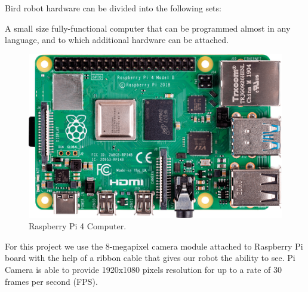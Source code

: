 \documentclass[runningheads]{llncs}
\begin{document}
Bird robot hardware can be divided into the following sets: 
\begin{description} 
 \item[$\bullet$ Raspberry Pi] 
 \item \noindent A small size fully-functional computer that can be programmed almost in any language, and to which additional hardware can be attached. 
 \begin{figure}[hbt!]
\includegraphics[width=\textwidth]{rasp_pi_4_b_03_anw.png}
\caption{Raspberry Pi 4 Computer.} \label{fig1}
\end{figure}
  \item[$\bullet$ Pi Camera] 
 \item\noindent For this project we use the 8-megapixel camera module attached to Raspberry Pi board with the help of a ribbon cable that gives our robot the ability to see. Pi Camera is able to provide 1920x1080 pixels resolution for up to a rate of 30 frames per second (FPS).
 

\end{description}
\end{document}
